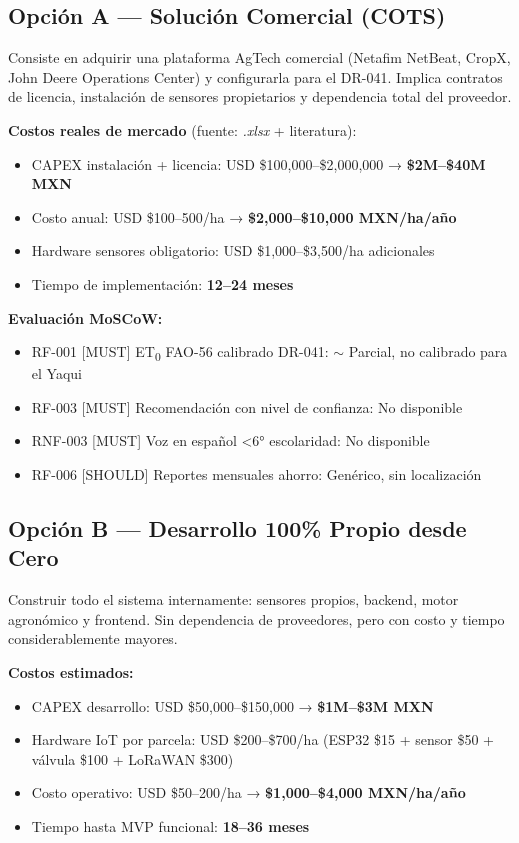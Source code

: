 \documentclass[12pt,letterpaper]{article}
\newcommand{\cmark}{{\color{verdeOk}\bfseries\ding{51}}}
\newcommand{\xmark}{{\color{red!60!black}\bfseries\ding{55}}}
\newcommand{\mmark}{{\color{orange!80!black}\bfseries$\sim$}}
\begin{document}
\subsection{Opción A — Solución Comercial (COTS)}

Consiste en adquirir una plataforma AgTech comercial (Netafim NetBeat, CropX, John Deere
Operations Center) y configurarla para el DR-041. Implica contratos de licencia, instalación
de sensores propietarios y dependencia total del proveedor.

\textbf{Costos reales de mercado} (fuente: \textit{.xlsx} + literatura):
\begin{itemize}
  \item CAPEX instalación + licencia: USD \$100{,}000–\$2{,}000{,}000 → \textbf{\$2M–\$40M MXN}
  \item Costo anual: USD \$100–500/ha → \textbf{\$2{,}000–\$10{,}000 MXN/ha/año}
  \item Hardware sensores obligatorio: USD \$1{,}000–\$3{,}500/ha adicionales
  \item Tiempo de implementación: \textbf{12–24 meses}
\end{itemize}

\textbf{Evaluación MoSCoW:}
\begin{itemize}
  \item RF-001 [MUST] ET\textsubscript{0} FAO-56 calibrado DR-041: \mmark{} Parcial, no calibrado para el Yaqui
  \item RF-003 [MUST] Recomendación con nivel de confianza: \xmark{} No disponible
  \item RNF-003 [MUST] Voz en español \textless{}6° escolaridad: \xmark{} No disponible
  \item RF-006 [SHOULD] Reportes mensuales ahorro: \cmark{} Genérico, sin localización
\end{itemize}

\subsection{Opción B — Desarrollo 100\% Propio desde Cero}

Construir todo el sistema internamente: sensores propios, backend, motor agronómico y
frontend. Sin dependencia de proveedores, pero con costo y tiempo considerablemente mayores.

\textbf{Costos estimados:}
\begin{itemize}
  \item CAPEX desarrollo: USD \$50{,}000–\$150{,}000 → \textbf{\$1M–\$3M MXN}
  \item Hardware IoT por parcela: USD \$200–\$700/ha (ESP32 \$15 + sensor \$50 + válvula \$100 + LoRaWAN \$300)
  \item Costo operativo: USD \$50–200/ha → \textbf{\$1{,}000–\$4{,}000 MXN/ha/año}
  \item Tiempo hasta MVP funcional: \textbf{18–36 meses}
\end{itemize}
\end{document}
